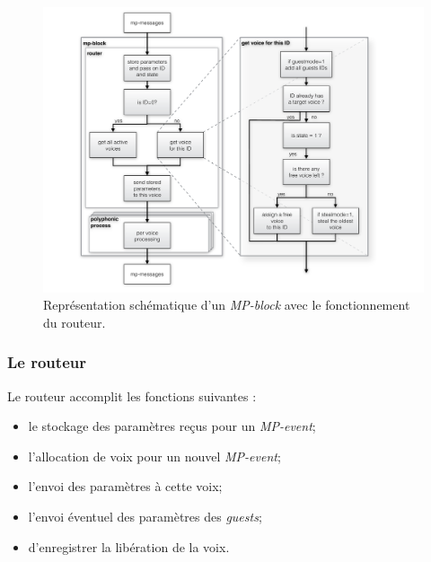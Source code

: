\begin{figure}[!htbp]
	\captionsetup{format=plain}
	\includegraphics[width=\textwidth]{gfx/04_algorithms/MP-block-model.pdf}
	\caption[Représentation schématique d'un \textit{MP-block}]{Représentation schématique d'un \textit{MP-block} avec le fonctionnement du routeur.}
	\label{fig:algorithms:MP-block-model}
\end{figure}


\subsubsection{Le routeur}

\noindent Le routeur accomplit les fonctions suivantes :
\vspace{-1em}
\begin{itemize}[noitemsep]
	\item le stockage des paramètres reçus pour un \textit{MP-event};
	\item l'allocation de voix pour un nouvel \textit{MP-event};
	\item l'envoi des paramètres à cette voix;
	\item l'envoi éventuel des paramètres des \textit{guests};
	\item d'enregistrer la libération de la voix.
\end{itemize}

